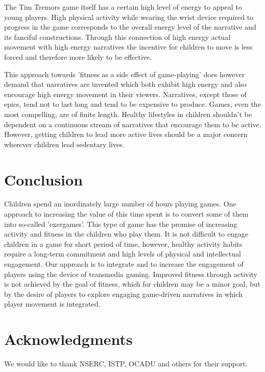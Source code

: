 \documentclass{SIGCHI2015LaTex/sigchi}
\begin{document}
The Tim Tremors game itself has a certain high level of energy to appeal to young players. High physical activity while wearing the wrist device required to progress in the game corresponds to the overall energy level of the narrative and its fanciful constructions. Through this connection of high energy actual movement with high energy narratives the incentive for children to move is less forced and therefore more likely to be effective. 

This approach towards 'fitness as a side effect of game-playing' does however demand that narratives are invented which both exhibit high energy and also encourage high energy movement in their viewers. Narratives, except those of epics, tend not to last long and tend to be expensive to produce. Games, even the most compelling, are of finite length. Healthy lifestyles in children shouldn't be dependent on a continuous stream of narratives that encourage them to be active. However, getting children to lead more active lives should be a major concern wherever children lead sedentary lives. 

\section{Conclusion}
Children spend an inordinately large number of hours playing games. One approach to increasing the value of this time spent is to convert some of them into so-called 'exergames'. This type of game has the promise of increasing activity and fitness in the children who play them. It is not difficult to engage children in a game for short period of time, however, healthy activity habits require a long-term commitment and high levels of physical and intellectual engagement. Our approach is to integrate and to increase the engagement of players using the device of transmedia gaming. Improved fitness through activity is not achieved by the goal of fitness, which for children may be a minor goal, but by the desire of players to explore engaging game-driven narratives in which player movement is integrated. 

\section{Acknowledgments}

We would like to thank NSERC, ISTP, OCADU and others for their support.

%
%
%
%
%
\balance
\end{document}
